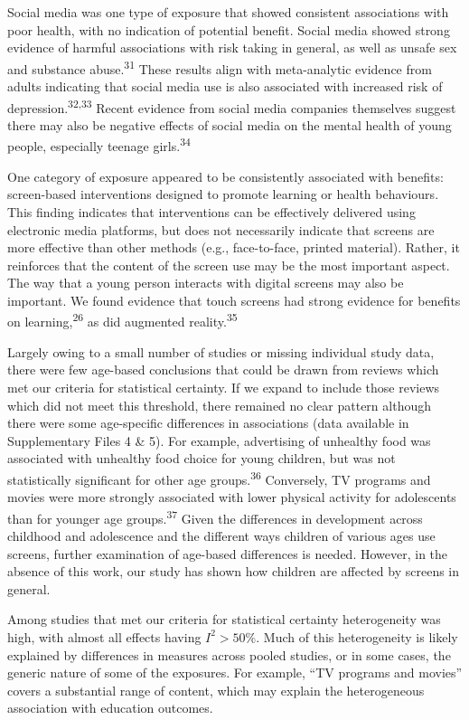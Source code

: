 \documentclass[
  english,
  man]{apa6}
\begin{document}
Social media was one type of exposure that showed consistent associations with poor health, with no indication of potential benefit.
Social media showed strong evidence of harmful associations with risk taking in general, as well as unsafe sex and substance abuse.\textsuperscript{31}
These results align with meta-analytic evidence from adults indicating that social media use is also associated with increased risk of depression.\textsuperscript{32,33}
Recent evidence from social media companies themselves suggest there may also be negative effects of social media on the mental health of young people, especially teenage girls.\textsuperscript{34}

One category of exposure appeared to be consistently associated with benefits: screen-based interventions designed to promote learning or health behaviours.
This finding indicates that interventions can be effectively delivered using electronic media platforms, but does not necessarily indicate that screens are more effective than other methods (e.g., face-to-face, printed material).
Rather, it reinforces that the content of the screen use may be the most important aspect.
The way that a young person interacts with digital screens may also be important.
We found evidence that touch screens had strong evidence for benefits on learning,\textsuperscript{26} as did augmented reality.\textsuperscript{35}

Largely owing to a small number of studies or missing individual study data, there were few age-based conclusions that could be drawn from reviews which met our criteria for statistical certainty.
If we expand to include those reviews which did not meet this threshold, there remained no clear pattern although there were some age-specific differences in associations (data available in Supplementary Files 4 \& 5).
For example, advertising of unhealthy food was associated with unhealthy food choice for young children, but was not statistically significant for other age groups.\textsuperscript{36}
Conversely, TV programs and movies were more strongly associated with lower physical activity for adolescents than for younger age groups.\textsuperscript{37}
Given the differences in development across childhood and adolescence and the different ways children of various ages use screens, further examination of age-based differences is needed.
However, in the absence of this work, our study has shown how children are affected by screens in general.

Among studies that met our criteria for statistical certainty heterogeneity was high, with almost all effects having \(I^2 > 50\%\).
Much of this heterogeneity is likely explained by differences in measures across pooled studies, or in some cases, the generic nature of some of the exposures.
For example, ``TV programs and movies'' covers a substantial range of content, which may explain the heterogeneous association with education outcomes.
\end{document}
